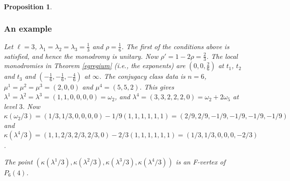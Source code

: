 \documentclass[11pt]{amsart}
\newtheorem{remark}[theorem]{ Remark}
\newtheorem{proposition}[theorem]{Proposition}
\numberwithin{theorem}{subsection}
\begin{document}
{\begin{proposition}
\subsubsection{An example}
Let $\ell=3$, $\lambda_1=\lambda_2=\lambda_3=\frac{1}{3}$ and $\rho= \frac{1}{6}$. The first of the conditions
above is satisfied, and hence the monodromy is unitary. Now $\rho'=1-2\rho=\frac{2}{3}$. The local monodromies in Theorem \ref{egregium} (i.e., the exponents) are $(0,0,\frac{2}{6})$ at $t_1$, $t_2$ and $t_3$ and $(-\frac{1}{6},-\frac{1}{6},-\frac{4}{6})$ at $\infty$. The conjugacy class data is $n=6$, $\mu^1=\mu^2=\mu^3=(2,0,0)$
and $\mu^4=(5,5,2)$. This gives $\lambda^1=\lambda^2=\lambda^3=(1,1,0,0,0,0)=\omega_2$, and $\lambda^4 = (3,3,2,2,2,0)=\omega_2+2\omega_5$ at level $3$. Now $\kappa(\omega_2/3)=(1/3,1/3,0,0,0,0)-1/9(1,1,1,1,1,1)= (2/9,2/9,-1/9,-1/9,-1/9,-1/9)$ and $\kappa(\lambda^4/3)= (1,1,2/3,2/3,2/3,0)-2/3(1,1,1,1,1,1)=(1/3,1/3,0,0,0,-2/3)$.

 The point $(\kappa(\lambda^1/3),\kappa(\lambda^2/3),\kappa(\lambda^3/3),\kappa(\lambda^4/3))$ is an F-vertex of $P_6(4)$.
 \fi

\end{proposition}}
\end{document}
